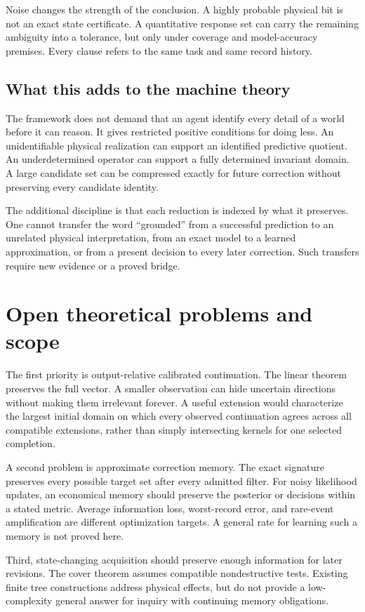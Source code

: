 \documentclass[11pt,letterpaper]{article}
\theoremstyle{plain}
\theoremstyle{definition}
\begin{document}
Noise changes the strength of the conclusion. A highly probable physical bit is not an exact state certificate. A quantitative response set can carry the remaining ambiguity into a tolerance, but only under coverage and model-accuracy premises. Every clause refers to the same task and same record history.

\subsection{What this adds to the machine theory}
The framework does not demand that an agent identify every detail of a world before it can reason. It gives restricted positive conditions for doing less. An unidentifiable physical realization can support an identified predictive quotient. An underdetermined operator can support a fully determined invariant domain. A large candidate set can be compressed exactly for future correction without preserving every candidate identity.

The additional discipline is that each reduction is indexed by what it preserves. One cannot transfer the word ``grounded'' from a successful prediction to an unrelated physical interpretation, from an exact model to a learned approximation, or from a present decision to every later correction. Such transfers require new evidence or a proved bridge.

\section{Open theoretical problems and scope}\label{sec:open}
The first priority is output-relative calibrated continuation. The linear theorem preserves the full vector. A smaller observation can hide uncertain directions without making them irrelevant forever. A useful extension would characterize the largest initial domain on which every observed continuation agrees across all compatible extensions, rather than simply intersecting kernels for one selected completion.

A second problem is approximate correction memory. The exact signature preserves every possible target set after every admitted filter. For noisy likelihood updates, an economical memory should preserve the posterior or decisions within a stated metric. Average information loss, worst-record error, and rare-event amplification are different optimization targets. A general rate for learning such a memory is not proved here.

Third, state-changing acquisition should preserve enough information for later revisions. The cover theorem assumes compatible nondestructive tests. Existing finite tree constructions address physical effects, but do not provide a low-complexity general answer for inquiry with continuing memory obligations.
\end{document}
